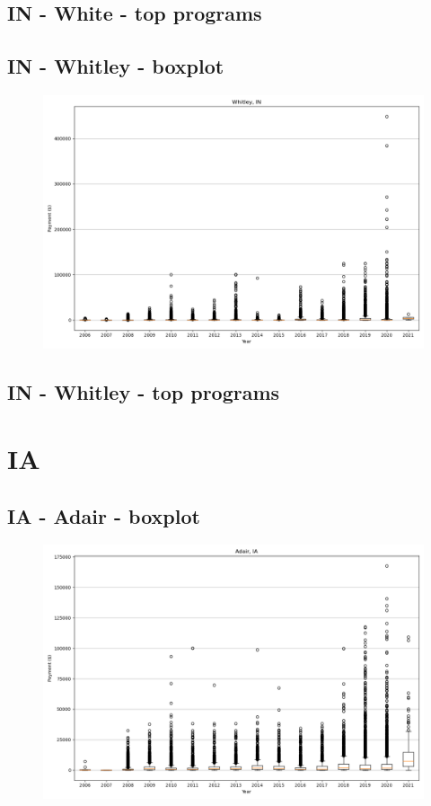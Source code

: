 \subsection*{IN - White - top programs}

\newpage
\subsection*{IN - Whitley - boxplot}
\begin{figure}[h]
\centering
\includegraphics[width=7in]{../output/boxplots/counties/Whitley-IN_boxplot.png}
\end{figure}


\subsection*{IN - Whitley - top programs}

\newpage
\section*{IA}
\subsection*{IA - Adair - boxplot}
\begin{figure}[h]
\centering
\includegraphics[width=7in]{../output/boxplots/counties/Adair-IA_boxplot.png}
\end{figure}


